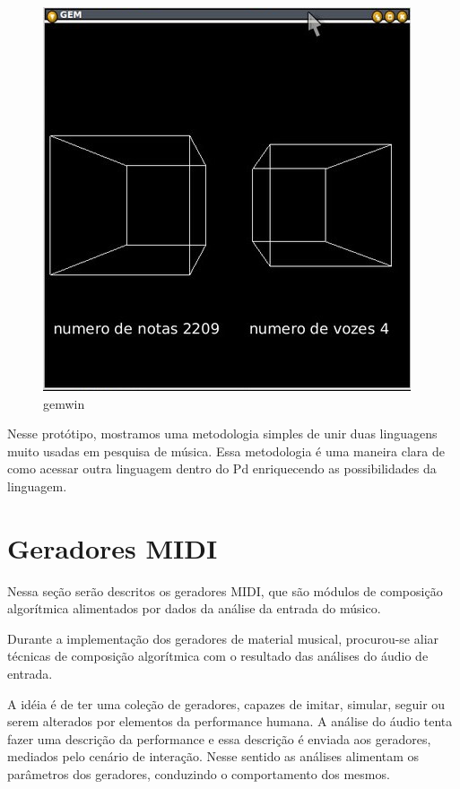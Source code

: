 \documentclass[draft]{ppgmus}
\begin{document}
\begin{figure}
\includegraphics[scale=.5]{gemwin}
\caption{gemwin}
\label{gemwin}
\end{figure} 



  Nesse protótipo, mostramos uma metodologia
simples de unir duas linguagens muito usadas em pesquisa de música.
Essa metodologia é uma maneira clara de como acessar outra linguagem dentro do Pd
enriquecendo as possibilidades da linguagem.


\pagebreak





\section{Geradores MIDI}


Nessa seção serão descritos os geradores MIDI, que
são módulos de composição algorítmica alimentados
por dados da análise da entrada do músico.

Durante a implementação dos geradores de material musical,
procurou-se aliar técnicas de composição algorítmica com
o resultado das análises do áudio de entrada.


A idéia é de ter uma coleção de geradores, capazes
de imitar, simular, seguir ou serem alterados por elementos da performance humana. A análise do áudio
tenta fazer uma descrição da performance e essa descrição
é enviada aos geradores, mediados pelo cenário de interação.
Nesse sentido as análises alimentam os parâmetros dos
geradores, conduzindo o comportamento dos mesmos.
\end{document}
